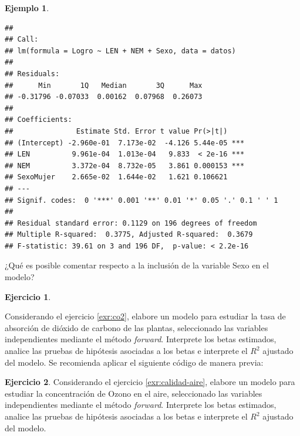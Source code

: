 \documentclass[
  11pt,
]{book}
\newenvironment{Shaded}{\begin{snugshade}}{\end{snugshade}}
\newcommand{\AttributeTok}[1]{\textcolor[rgb]{0.13,0.29,0.53}{#1}}
\newcommand{\FunctionTok}[1]{\textcolor[rgb]{0.13,0.29,0.53}{\textbf{#1}}}
\newcommand{\NormalTok}[1]{#1}
\newcommand{\OtherTok}[1]{\textcolor[rgb]{0.56,0.35,0.01}{#1}}
\newcommand{\SpecialCharTok}[1]{\textcolor[rgb]{0.81,0.36,0.00}{\textbf{#1}}}
\theoremstyle{definition}
\theoremstyle{definition}
\newtheorem{example}{Ejemplo}[chapter]
\theoremstyle{definition}
\newtheorem{exercise}{Ejercicio}[chapter]
\theoremstyle{definition}
\theoremstyle{remark}
\begin{document}
\begin{example}
\begin{verbatim}
## 
## Call:
## lm(formula = Logro ~ LEN + NEM + Sexo, data = datos)
## 
## Residuals:
##      Min       1Q   Median       3Q      Max 
## -0.31796 -0.07033  0.00162  0.07968  0.26073 
## 
## Coefficients:
##               Estimate Std. Error t value Pr(>|t|)    
## (Intercept) -2.960e-01  7.173e-02  -4.126 5.44e-05 ***
## LEN          9.961e-04  1.013e-04   9.833  < 2e-16 ***
## NEM          3.372e-04  8.732e-05   3.861 0.000153 ***
## SexoMujer    2.665e-02  1.644e-02   1.621 0.106621    
## ---
## Signif. codes:  0 '***' 0.001 '**' 0.01 '*' 0.05 '.' 0.1 ' ' 1
## 
## Residual standard error: 0.1129 on 196 degrees of freedom
## Multiple R-squared:  0.3775, Adjusted R-squared:  0.3679 
## F-statistic: 39.61 on 3 and 196 DF,  p-value: < 2.2e-16
\end{verbatim}

¿Qué es posible comentar respecto a la inclusión de la variable Sexo en el modelo?
\end{example}

\begin{exercise}
\protect\hypertarget{exr:forward2}{}\label{exr:forward2}

Considerando el ejercicio \ref{exr:co2}, elabore un modelo para estudiar la tasa de absorción de dióxido de carbono de las plantas, seleccionado las variables independientes mediante el método \emph{forward}. Interprete los betas estimados, analice las pruebas de hipótesis asociadas a los betas e interprete el \(R^2\) ajustado del modelo. Se recomienda aplicar el siguiente código de manera previa:

\begin{Shaded}
\end{Shaded}

\end{exercise}

\begin{exercise}
\protect\hypertarget{exr:forward3}{}\label{exr:forward3}Considerando el ejercicio \ref{exr:calidad-aire}, elabore un modelo para estudiar la concentración de Ozono en el aire, seleccionado las variables independientes mediante el método \emph{forward}. Interprete los betas estimados, analice las pruebas de hipótesis asociadas a los betas e interprete el \(R^2\) ajustado del modelo.
\end{exercise}
\end{document}
